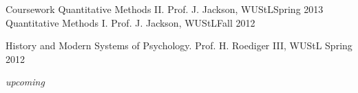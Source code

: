 \documentclass {resume}
\begin{document}
\begin{rSection}{\textrm{Coursework}}
Quantitative Methods \textrm{II}. Prof. J. Jackson, WUStL\hfill  {Spring 2013}\smallskip\\
Quantitative Methods \textrm{I}. Prof. J. Jackson, WUStL\hfill  {Fall 2012}\smallskip\\
\begin{samepage}History and Modern Systems of Psychology. Prof. H. Roediger \textrm{III}, WUStL \hfill  {Spring 2012}\vspace{-2mm}\begin{center}\footnotesize{ \textit{upcoming}%
}\end{center} \vspace{-4mm}\end{samepage}
\end{rSection}
\end{document}
